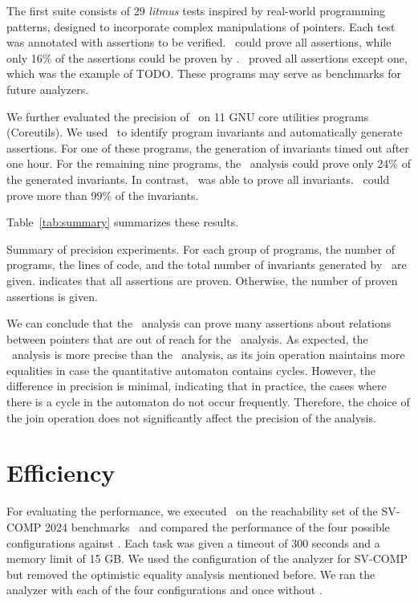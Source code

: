 The first suite consists of 29 \emph{litmus} tests inspired by real-world programming patterns,
designed to incorporate complex manipulations of pointers.
Each test was annotated with assertions to be verified.
\cpou\ could prove all assertions,
while only 16\% of the assertions could be proven by \base.
\cpod\ proved all assertions except one, which was the example of TODO.
These programs may serve as benchmarks for future analyzers.

We further evaluated the precision of \cpo\ on 11 GNU core utilities programs (Coreutils).
We used \cpou\ to identify program invariants and automatically generate assertions.
For one of these programs, the generation of invariants timed out after one hour.
For the remaining nine programs, the \base\ analysis could prove only 24\% of the generated invariants.
In contrast, \cpou\ was able to prove all invariants.
\cpod\ could prove more than 99\% of the invariants.

Table~\ref{tab:summary} summarizes these results.

\begin{table}[t]
    \centering
    \caption{Summary of precision experiments. For each group of programs, the number of programs, the lines of code, and the total number of invariants generated by \cpou\ are given.
         indicates that all assertions are proven. Otherwise, the number of proven assertions is given.}
    \label{tab:summary}
    
\end{table}

We can conclude that the \cpo\ analysis can prove many assertions about relations between pointers that are out of reach for the \base\ analysis.
As expected, the \cpou\ analysis is more precise than the \cpod\ analysis, as its join operation maintains more equalities in case the quantitative automaton contains cycles.
However, the difference in precision is minimal, indicating that in practice, the cases where there is a cycle in the automaton do not occur frequently.
Therefore, the choice of the join operation does not significantly affect the precision of the analysis.

\section{Efficiency}

For evaluating the performance, we executed \cpo\ on the reachability set
of the SV-COMP 2024 benchmarks~\cite{Beyer24} and compared the performance of the four possible configurations against \base.
Each task was given a timeout of 300 seconds and a memory limit of 15 GB.\@
We used the configuration of the analyzer for SV-COMP but removed the optimistic equality analysis mentioned before.
We ran the analyzer with each of the four configurations and once without \cpo.

